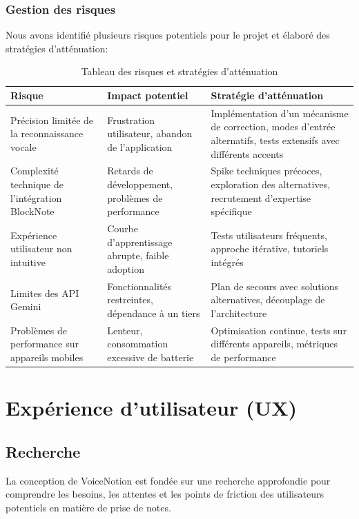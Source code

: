 \subsubsection{Gestion des risques}

Nous avons identifié plusieurs risques potentiels pour le projet et élaboré des stratégies d'atténuation:

\begin{table}[H]
\centering
\begin{tabular}{|p{3cm}|p{5cm}|p{5cm}|}
\hline
\textbf{Risque} & \textbf{Impact potentiel} & \textbf{Stratégie d'atténuation} \\
\hline
Précision limitée de la reconnaissance vocale & Frustration utilisateur, abandon de l'application & Implémentation d'un mécanisme de correction, modes d'entrée alternatifs, tests extensifs avec différents accents \\
\hline
Complexité technique de l'intégration BlockNote & Retards de développement, problèmes de performance & Spike techniques précoces, exploration des alternatives, recrutement d'expertise spécifique \\
\hline
Expérience utilisateur non intuitive & Courbe d'apprentissage abrupte, faible adoption & Tests utilisateurs fréquents, approche itérative, tutoriels intégrés \\
\hline
Limites des API Gemini & Fonctionnalités restreintes, dépendance à un tiers & Plan de secours avec solutions alternatives, découplage de l'architecture \\
\hline
Problèmes de performance sur appareils mobiles & Lenteur, consommation excessive de batterie & Optimisation continue, tests sur différents appareils, métriques de performance \\
\hline
\end{tabular}
\caption{Tableau des risques et stratégies d'atténuation}
\label{tab:risk_management}
\end{table}

\section{Expérience d'utilisateur (UX)}

\subsection{Recherche}

La conception de VoiceNotion est fondée sur une recherche approfondie pour comprendre les besoins, les attentes et les points de friction des utilisateurs potentiels en matière de prise de notes.

